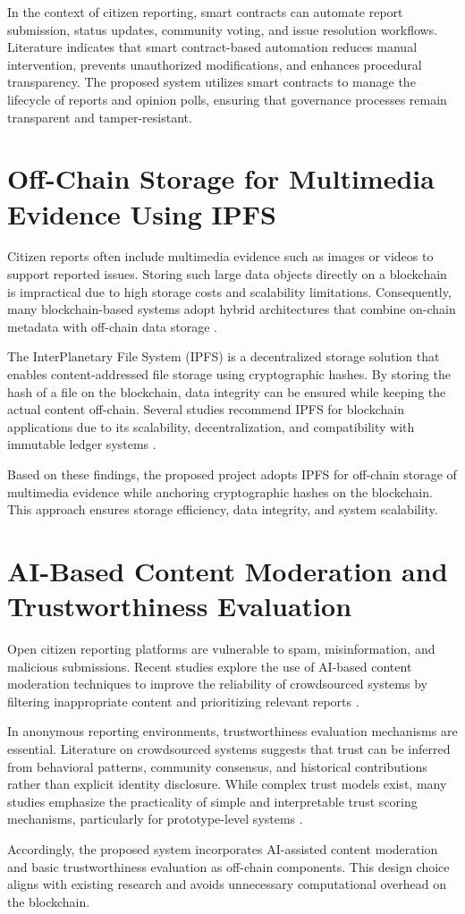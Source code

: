 In the context of citizen reporting, smart contracts can automate report submission, status updates, community voting, and issue resolution workflows. Literature indicates that smart contract-based automation reduces manual intervention, prevents unauthorized modifications, and enhances procedural transparency. The proposed system utilizes smart contracts to manage the lifecycle of reports and opinion polls, ensuring that governance processes remain transparent and tamper-resistant.

\section{Off-Chain Storage for Multimedia Evidence Using IPFS}

Citizen reports often include multimedia evidence such as images or videos to support reported issues. Storing such large data objects directly on a blockchain is impractical due to high storage costs and scalability limitations. Consequently, many blockchain-based systems adopt hybrid architectures that combine on-chain metadata with off-chain data storage \cite{ipfsdocs}.

The InterPlanetary File System (IPFS) is a decentralized storage solution that enables content-addressed file storage using cryptographic hashes. By storing the hash of a file on the blockchain, data integrity can be ensured while keeping the actual content off-chain. Several studies recommend IPFS for blockchain applications due to its scalability, decentralization, and compatibility with immutable ledger systems \cite{kader2024spam}.

Based on these findings, the proposed project adopts IPFS for off-chain storage of multimedia evidence while anchoring cryptographic hashes on the blockchain. This approach ensures storage efficiency, data integrity, and system scalability.

\section{AI-Based Content Moderation and Trustworthiness Evaluation}

Open citizen reporting platforms are vulnerable to spam, misinformation, and malicious submissions. Recent studies explore the use of AI-based content moderation techniques to improve the reliability of crowdsourced systems by filtering inappropriate content and prioritizing relevant reports \cite{mohammadi2025ai}.

In anonymous reporting environments, trustworthiness evaluation mechanisms are essential. Literature on crowdsourced systems suggests that trust can be inferred from behavioral patterns, community consensus, and historical contributions rather than explicit identity disclosure. While complex trust models exist, many studies emphasize the practicality of simple and interpretable trust scoring mechanisms, particularly for prototype-level systems \cite{zhai2022trust}.

Accordingly, the proposed system incorporates AI-assisted content moderation and basic trustworthiness evaluation as off-chain components. This design choice aligns with existing research and avoids unnecessary computational overhead on the blockchain.